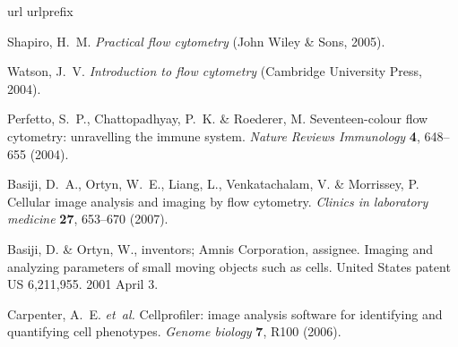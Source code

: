 \documentclass[aps,pra,reprint,superscriptaddress]{revtex4-1}
\begin{document}


% 
% 
\begin{thebibliography}{10}
\expandafter\ifx\csname url\endcsname\relax
  \def\url#1{\texttt{#1}}\fi
\expandafter\ifx\csname urlprefix\endcsname\relax\def\urlprefix{URL }\fi
\providecommand{\bibinfo}[2]{#2}
\providecommand{\eprint}[2][]{\url{#2}}

\bibinfo{author}{Shapiro, H.~M.}
\newblock \emph{\bibinfo{title}{Practical flow cytometry}}
  (\bibinfo{publisher}{John Wiley \& Sons}, \bibinfo{year}{2005}).

\bibinfo{author}{Watson, J.~V.}
\newblock \emph{\bibinfo{title}{Introduction to flow cytometry}}
  (\bibinfo{publisher}{Cambridge University Press}, \bibinfo{year}{2004}).

\bibinfo{author}{Perfetto, S.~P.}, \bibinfo{author}{Chattopadhyay, P.~K.} \&
  \bibinfo{author}{Roederer, M.}
\newblock \bibinfo{title}{Seventeen-colour flow cytometry: unravelling the
  immune system}.
\newblock \emph{\bibinfo{journal}{Nature Reviews Immunology}}
  \textbf{\bibinfo{volume}{4}}, \bibinfo{pages}{648--655}
  (\bibinfo{year}{2004}).

\bibinfo{author}{Basiji, D.~A.}, \bibinfo{author}{Ortyn, W.~E.},
  \bibinfo{author}{Liang, L.}, \bibinfo{author}{Venkatachalam, V.} \&
  \bibinfo{author}{Morrissey, P.}
\newblock \bibinfo{title}{Cellular image analysis and imaging by flow
  cytometry}.
\newblock \emph{\bibinfo{journal}{Clinics in laboratory medicine}}
  \textbf{\bibinfo{volume}{27}}, \bibinfo{pages}{653--670}
  (\bibinfo{year}{2007}).

\bibinfo{author}{Basiji, D.} \& \bibinfo{author}{Ortyn, W.}, inventors; Amnis Corporation, assignee. 
\newblock \bibinfo{title}{Imaging and analyzing parameters of small moving
  objects such as cells}.
\newblock \bibinfo{note}{United States patent US 6,211,955}. \bibinfo{year}{2001} \bibinfo{month}{April} 3.


\bibinfo{author}{Carpenter, A.~E.} \emph{et~al.}
\newblock \bibinfo{title}{Cellprofiler: image analysis software for identifying
  and quantifying cell phenotypes}.
\newblock \emph{\bibinfo{journal}{Genome biology}}
  \textbf{\bibinfo{volume}{7}}, \bibinfo{pages}{R100} (\bibinfo{year}{2006}).


\end{thebibliography}
\end{document}
